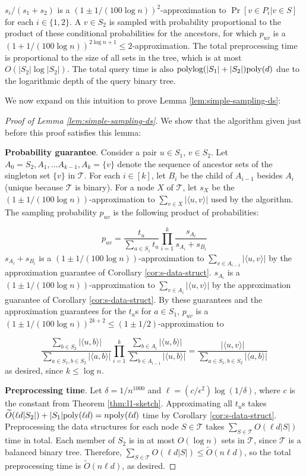 $s_i/(s_1 + s_2)$ is a $(1 \pm 1/(100\log n))^2$-approximation to $\Pr[v\in P_i | v\in S]$ for each $i\in \{1,2\}$. A $v\in S_2$ is sampled with probability proportional to the product of these conditional probabilities for the ancestors, for which $p_{uv}$ is a $(1 + 1/(100\log n))^{2\log n + 1}\le 2$-approximation. The total preprocessing time is proportional to the size of all sets in the tree, which is at most $O(|S_2|\log |S_2|)$. The total query time is also $\text{polylog}(|S_1| + |S_2|)\mathrm{poly}(d)$ due to the logarithmic depth of the query binary tree.

We now expand on this intuition to prove Lemma \ref{lem:simple-sampling-ds}:

\begin{proof}[Proof of Lemma \ref{lem:simple-sampling-ds}]
We show that the algorithm given just before this proof satisfies this lemma:

\textbf{Probability guarantee}. Consider a pair $u\in S_1$, $v\in S_2$. Let $A_0 = S_2, A_1,\hdots A_{k-1}, A_k = \{v\}$ denote the sequence of ancestor sets of the singleton set $\{v\}$ in $\mathcal{T}$. For each $i\in [k]$, let $B_i$ be the child of $A_{i-1}$ besides $A_i$ (unique because $\mathcal{T}$ is binary). For a node $X$ of $\mathcal{T}$, let $s_X$ be the $(1\pm 1/(100\log n))$-approximation to $\sum_{v\in X} |\langle u,v\rangle|$ used by the algorithm. The sampling probability $p_{uv}$ is the following product of probabilities:

$$p_{uv} = \frac{t_u}{\sum_{a\in S_1} t_a} \prod_{i=1}^k \frac{s_{A_i}}{s_{A_i} + s_{B_i}}$$
$s_{A_i} + s_{B_i}$ is a $(1\pm 1/(100\log n))$-approximation to $\sum_{v\in A_{i-1}} |\langle u,v\rangle|$ by the approximation guarantee of Corollary \ref{cor:s-data-struct}. $s_{A_i}$ is a $(1\pm 1/(100\log n))$-approximation to $\sum_{v\in A_i} |\langle u,v\rangle|$ by the approximation guarantee of Corollary \ref{cor:s-data-struct}. By these guarantees and the approximation guarantees for the $t_a$s for $a\in S_1$, $p_{uv}$ is a $(1 \pm 1/(100\log n))^{2k+2}\le (1\pm 1/2)$-approximation to

$$\frac{\sum_{b\in S_2} |\langle u,b\rangle|}{\sum_{a\in S_1,b\in S_2} |\langle a,b\rangle|}\prod_{i=1}^k \frac{\sum_{b\in A_i} |\langle u,b\rangle|}{\sum_{b\in A_{i-1}} |\langle u,b\rangle|} = \frac{|\langle u,v\rangle|}{\sum_{a\in S_1,b\in S_2} |\langle a,b\rangle|}$$
as desired, since $k\le \log n$.

\textbf{Preprocessing time}. Let $\delta = 1/n^{1000}$ and $\ell = (c/\epsilon^2)\log(1/\delta)$, where $c$ is the constant from Theorem \ref{thm:l1-sketch}. Approximating all $t_u$s takes $\widetilde{O}(\ell d |S_2|) + |S_1|\mathrm{poly}(\ell d) = n \mathrm{poly}(\ell d)$ time by Corollary \ref{cor:s-data-struct}. Preprocessing the data structures for each node $S\in \mathcal{T}$ takes $\sum_{S\in \mathcal{T}} O(\ell d |S|)$ time in total. Each member of $S_2$ is in at most $O(\log n)$ sets in $\mathcal{T}$, since $\mathcal{T}$ is a balanced binary tree. Therefore, $\sum_{S\in \mathcal{T}} O(\ell d |S|)\le \tilde{O}(n\ell d)$, so the total preprocessing time is $\tilde{O}(n\ell d)$, as desired.


\end{proof}
